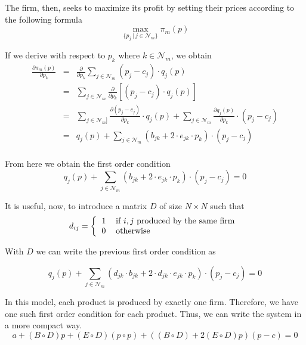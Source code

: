 \documentclass[12pt]{article}
\begin{document}
The firm, then, seeks to maximize its profit by setting their prices according to the following formula
\begin{equation*}
\max_{\{p_j ~ | ~ j \in \mathcal{N}_m\}} \pi_m(p)
\end{equation*}

If we derive with respect to $p_k$ where $k \in \mathcal{N}_m$, we obtain
\begin{eqnarray*}
\frac{\partial \pi_m(p)}{\partial p_k} &=& \frac{\partial}{\partial p_k} \sum_{j \in \mathcal{N}_m} (p_j - c_j) \cdot q_j(p)\\
&=& \sum_{j \in \mathcal{N}_m} \frac{\partial}{\partial	p_k} [(p_j - c_j) \cdot q_j(p)]\\
&=& \sum_{j \in \mathcal{N}_m]} \frac{\partial (p_j - c_j)}{\partial p_k} \cdot q_j(p) + \sum_{j \in \mathcal{N}_m} \frac{\partial q_j(p)}{\partial p_k} \cdot (p_j - c_j)\\
&=& q_j(p) + \sum_{j \in \mathcal{N}_m} (b_{jk} + 2 \cdot e_{jk} \cdot p_k) \cdot (p_j - c_j)\\
\end{eqnarray*}

From here we obtain the first order condition
\begin{equation*}
q_j(p) + \sum_{j \in \mathcal{N}_m} (b_{jk} + 2 \cdot e_{jk} \cdot p_k) \cdot (p_j - c_j) = 0
\end{equation*}

It is useful, now, to introduce a matrix $D$ of size $N \times N$ such that
\begin{equation*}
d_{ij} = \left\{
\begin{tabular}{ll}
1 & if $i,j$ produced by the same firm\\
0 & otherwise
\end{tabular}\right.
\end{equation*}

With $D$ we can write the previous first order condition as

\begin{equation*}
q_j(p) + \sum_{j \in \mathcal{N}_m} (d_{jk} \cdot b_{jk} + 2 \cdot d_{jk} \cdot e_{jk} \cdot p_k) \cdot (p_j - c_j) = 0
\end{equation*}

In this model, each product is produced by exactly one firm. Therefore, we have one such first order condition for each product. Thus, we can write the system in a more compact way.
\begin{equation*}
a +(B \circ D) p + (E \circ D) (p \circ p) + ((B \circ D) + 2 (E \circ D) p) (p - c) = 0 
\end{equation*}
\end{document}
